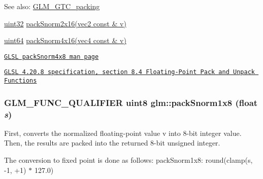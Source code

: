 \begin{Desc}
\item[See also:]\hyperlink{group__gtc__packing}{GLM\_\-GTC\_\-packing} 

\hyperlink{group__gtc__type__precision_g202b6a53c105fcb7e531f9b443518451}{uint32} \hyperlink{group__core__func__packing_g0c8005de240d6c4ca3d16c7bee25c622}{packSnorm2x16(vec2 const \& v)} 

\hyperlink{group__gtc__type__precision_ge3632bf9b37da66233d78930dd06378a}{uint64} \hyperlink{group__gtc__packing_g9b237d7c66b7a71964e6d1f4dc06539f}{packSnorm4x16(vec4 const \& v)} 

\href{http://www.opengl.org/sdk/docs/manglsl/xhtml/packSnorm4x8.xml}{\tt GLSL packSnorm4x8 man page} 

\href{http://www.opengl.org/registry/doc/GLSLangSpec.4.20.8.pdf}{\tt GLSL 4.20.8 specification, section 8.4 Floating-Point Pack and Unpack Functions} \end{Desc}
\hypertarget{group__gtc__packing_g26b6cd7a35c46c4b6a342f3b97b47423}{
\subsubsection[packSnorm1x8]{\setlength{\rightskip}{0pt plus 5cm}GLM\_\-FUNC\_\-QUALIFIER uint8 glm::packSnorm1x8 (float {\em s})}}
\label{group__gtc__packing_g26b6cd7a35c46c4b6a342f3b97b47423}


First, converts the normalized floating-point value v into 8-bit integer value. Then, the results are packed into the returned 8-bit unsigned integer.

The conversion to fixed point is done as follows: packSnorm1x8: round(clamp(s, -1, +1) $\ast$ 127.0)

